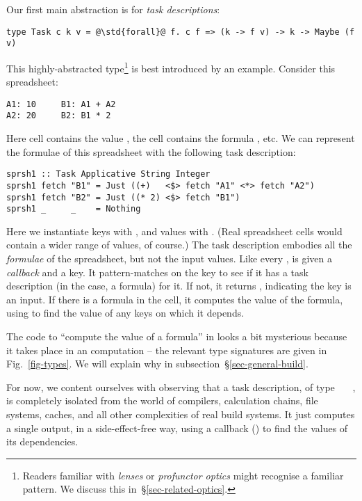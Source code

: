 Our first main abstraction is for \emph{task descriptions}:
\begin{verbatim}
type Task c k v = @\std{forall}@ f. c f => (k -> f v) -> k -> Maybe (f v)
\end{verbatim}
This highly-abstracted type\footnote{Readers familiar with \emph{lenses} or
\emph{profunctor optics} might recognise a familiar pattern. We discuss this
in~\S\ref{sec-related-optics}.} is best introduced by an example.
Consider this \Excel spreadsheet:
\vspace{1mm}
\begin{verbatim}
A1: 10     B1: A1 + A2
A2: 20     B2: B1 * 2
\end{verbatim}
\vspace{1mm}
Here cell  contains the value , the cell  contains
the formula , etc. We can represent the formulae of this spreadsheet
with the following task description:
\vspace{1mm}
\begin{verbatim}
sprsh1 :: Task Applicative String Integer
sprsh1 fetch "B1" = Just ((+)   <$> fetch "A1" <*> fetch "A2")
sprsh1 fetch "B2" = Just ((* 2) <$> fetch "B1")
sprsh1 _     _    = Nothing
\end{verbatim}
\vspace{1mm}
Here we instantiate keys  with , and values  with .
(Real spreadsheet cells would contain a wider range of values, of course.)
The task description  embodies all the \emph{formulae} of the spreadsheet,
but not the input values.  Like every ,  is given a
\emph{callback}  and a key. It pattern-matches on the key to see if it
has a task description (in the \Excel case, a formula) for it. If not, it returns
, indicating the key is an input. If there is a formula in the cell,
it computes the value of the formula, using  to find the value of any
keys on which it depends.

The code to ``compute the value of a formula'' in  looks a bit mysterious
because it takes place in an  computation \cite{mcbride2008applicative}
-- the relevant type signatures are given in Fig.~\ref{fig-types}. We will
explain why in subsection~\S\ref{sec-general-build}.

For now, we content ourselves with observing that a task description,
of type ~~~, is completely isolated from the world of
compilers, calculation chains, file systems, caches, and all other
complexities of real build systems.  It just computes a single output, in
a side-effect-free way, using a callback () to find the values
of its dependencies.

